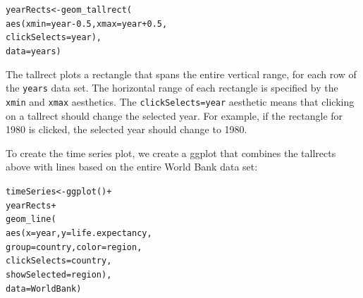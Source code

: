 \documentclass[journal]{vgtc}\usepackage[]{graphicx}\usepackage[]{color}
\makeatletter
\newcommand{\hlnum}[1]{\textcolor[rgb]{0,0,0}{#1}}%
\newcommand{\hlopt}[1]{\textcolor[rgb]{0,0,0}{#1}}%
\newcommand{\hlstd}[1]{\textcolor[rgb]{0,0,0}{#1}}%
\newcommand{\hlkwb}[1]{\textcolor[rgb]{0,0,0}{#1}}%
\newcommand{\hlkwc}[1]{\textcolor[rgb]{0,0,1}{#1}}%
\newcommand{\hlkwd}[1]{\textcolor[rgb]{0,0,0}{#1}}%
\newenvironment{kframe}{%
 \def\at@end@of@kframe{}%
 \ifinner\ifhmode%
  \def\at@end@of@kframe{\end{minipage}}%
  \begin{minipage}{\columnwidth}%
 \fi\fi%
 \def\FrameCommand##1{\hskip\@totalleftmargin \hskip-\fboxsep
 \colorbox{shadecolor}{##1}\hskip-\fboxsep
     \hskip-\linewidth \hskip-\@totalleftmargin \hskip\columnwidth}%
 \MakeFramed {\advance\hsize-\width
   \@totalleftmargin\z@ \linewidth\hsize
   \@setminipage}}%
 {\par\unskip\endMakeFramed%
 \at@end@of@kframe}
\newenvironment{knitrout}{}{} %
\makeatother
\begin{document}
\begin{knitrout}
\color{fgcolor}\begin{kframe}
\begin{alltt}
\hlstd{yearRects} \hlkwb{<-} \hlkwd{geom_tallrect}\hlstd{(}
  \hlkwd{aes}\hlstd{(}\hlkwc{xmin}\hlstd{=year}\hlopt{-}\hlnum{0.5}\hlstd{,} \hlkwc{xmax}\hlstd{=year}\hlopt{+}\hlnum{0.5}\hlstd{,}
      \hlkwc{clickSelects}\hlstd{=year),}
  \hlkwc{data}\hlstd{=years)}
\end{alltt}
\end{kframe}
\end{knitrout}

The tallrect plots a rectangle that spans the entire vertical range,
for each row of the \texttt{years} data set. The horizontal range of
each rectangle is specified by the \texttt{xmin} and \texttt{xmax}
aesthetics. The \texttt{clickSelects=year} aesthetic means that
clicking on a tallrect should change the selected year. For example,
if the rectangle for 1980 is clicked, the selected year should change
to 1980.





To create the time series plot, we create a ggplot that combines the
tallrects above with lines based on the entire World Bank data set:

\begin{knitrout}
\color{fgcolor}\begin{kframe}
\begin{alltt}
\hlstd{timeSeries} \hlkwb{<-} \hlkwd{ggplot}\hlstd{()}\hlopt{+}
  \hlstd{yearRects}\hlopt{+}
  \hlkwd{geom_line}\hlstd{(}
    \hlkwd{aes}\hlstd{(}\hlkwc{x}\hlstd{=year,} \hlkwc{y}\hlstd{=life.expectancy,}
        \hlkwc{group}\hlstd{=country,} \hlkwc{color}\hlstd{=region,}
        \hlkwc{clickSelects}\hlstd{=country,}
        \hlkwc{showSelected}\hlstd{=region),}
    \hlkwc{data}\hlstd{=WorldBank)}
\end{alltt}
\end{kframe}
\end{knitrout}
\end{document}
